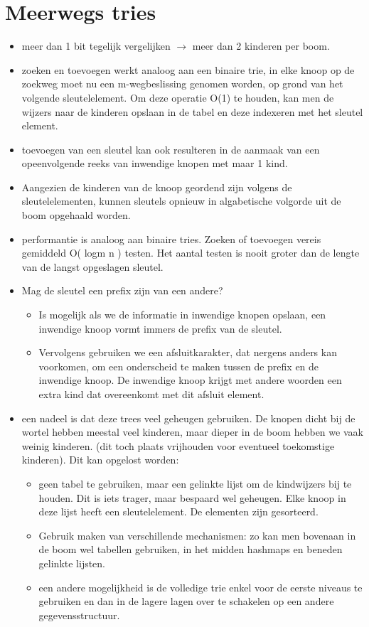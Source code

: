 \section{Meerwegs tries}
\begin{itemize}
\item meer dan 1 bit tegelijk vergelijken $\rightarrow$ meer dan 2 kinderen per boom.
\item zoeken en toevoegen werkt analoog aan een binaire trie, in elke knoop op de zoekweg moet nu een m-wegbeslissing genomen worden, op grond van het volgende sleutelelement. Om deze operatie O(1) te houden, kan men de wijzers naar de kinderen opslaan in de tabel en deze indexeren met het sleutel element.
\item toevoegen van een sleutel kan ook resulteren in de aanmaak van een opeenvolgende reeks van inwendige knopen met maar 1 kind.
\item Aangezien de kinderen van de knoop geordend zijn volgens de sleutelelementen, kunnen sleutels opnieuw in algabetische volgorde uit de boom opgehaald worden.
\item performantie is analoog aan binaire tries. Zoeken of toevoegen vereis gemiddeld O( logm n ) testen. Het aantal testen is nooit groter dan de lengte van de langst opgeslagen sleutel.
\item Mag de sleutel een prefix zijn van een andere? 
\begin{itemize}
\item Is mogelijk als we de informatie in inwendige knopen opslaan, een inwendige knoop vormt immers de prefix van de sleutel.
\item Vervolgens gebruiken we een afsluitkarakter, dat nergens anders kan voorkomen, om een onderscheid te maken tussen de prefix en de inwendige knoop. De inwendige knoop krijgt met andere woorden een extra kind dat overeenkomt met dit afsluit element.
\end{itemize}
\clearpage
\item een nadeel is dat deze trees veel geheugen gebruiken. De knopen dicht bij de wortel hebben meestal veel kinderen, maar dieper in de boom hebben we vaak weinig kinderen. (dit toch plaats vrijhouden voor eventueel toekomstige kinderen). Dit kan opgelost worden:
\begin{itemize}
\item geen tabel te gebruiken, maar een gelinkte lijst om de kindwijzers bij te houden. Dit is iets trager, maar bespaard wel geheugen. Elke knoop in deze lijst heeft een sleutelelement. De elementen zijn gesorteerd.
\item Gebruik maken van verschillende mechanismen: zo kan men bovenaan in de boom wel tabellen gebruiken, in het midden hashmaps en beneden gelinkte lijsten.
\item een andere mogelijkheid is de volledige trie enkel voor de eerste niveaus te gebruiken en dan in de lagere lagen over te schakelen op een andere gegevensstructuur.
\end{itemize}
\end{itemize}

